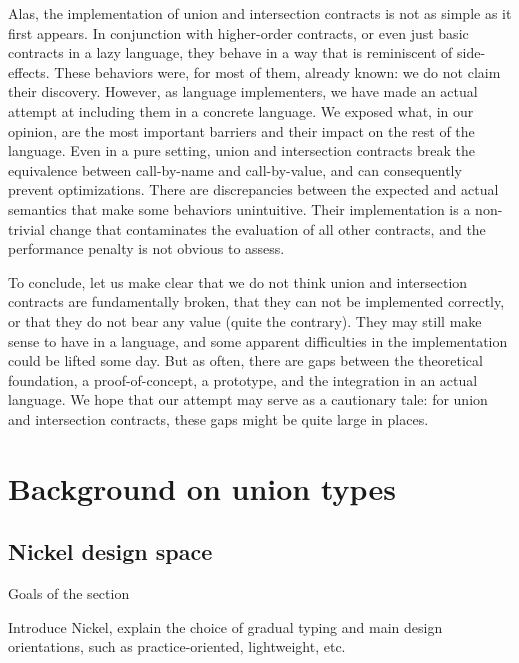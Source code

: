 \documentclass[sigplan,10pt,review,anonymous]{acmart}
\begin{document}
Alas, the implementation of union and intersection contracts is not as simple as
it first appears. In conjunction with higher-order contracts, or even just basic
contracts in a lazy language, they behave in a way that is reminiscent of
side-effects. These behaviors were, for most of them, already known: we do not
claim their discovery. However, as language implementers, we have made an actual
attempt at including them in a concrete language. We exposed what, in our
opinion, are the most important barriers and their impact on the rest of the
language. Even in a pure setting, union and intersection contracts break the
equivalence between call-by-name and call-by-value, and can consequently prevent
optimizations. There are discrepancies between the expected and actual semantics
that make some behaviors unintuitive. Their implementation is a non-trivial
change that contaminates the evaluation of all other contracts, and the
performance penalty is not obvious to assess.

To conclude, let us make clear that we do not think union and intersection
contracts are fundamentally broken, that they can not be implemented correctly,
or that they do not bear any value (quite the contrary). They may still make
sense to have in a language, and some apparent difficulties in the
implementation could be lifted some day. But as often, there are gaps between
the theoretical foundation, a proof-of-concept, a prototype, and the integration
in an actual language. We hope that our attempt may serve as a cautionary tale:
for union and intersection contracts, these gaps might be quite large in places.



\appendix


\section{Background on union types}

\subsection{Nickel design space}

{\color{red}Goals of the section

Introduce Nickel, explain the choice of gradual
typing and main design orientations, such as practice-oriented, lightweight,
etc.\vspace{0.5cm}}
\end{document}
